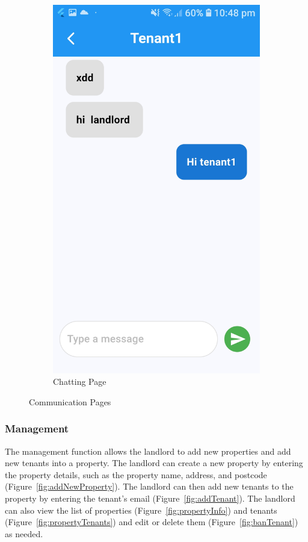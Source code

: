 \documentclass[sigconf]{acmart}
\begin{document}
\begin{figure}[h]
\begin{subfigure}{0.24\textwidth}
    \includegraphics[width=\textwidth]{chatting.jpg}
    \caption{Chatting Page}
    \label{fig:chatRoom}
  \end{subfigure}
  \caption{Communication Pages}
\end{figure}

\subsubsection{Management}
The management function allows the landlord to add new properties and add new tenants into a property. The landlord can create a new property by entering the property details, such as the property name, address, and postcode (Figure~\ref{fig:addNewProperty}). The landlord can then add new tenants to the property by entering the tenant's email (Figure~\ref{fig:addTenant}). The landlord can also view the list of properties (Figure~\ref{fig:propertyInfo}) and tenants (Figure~\ref{fig:propertyTenants}) and edit or delete them (Figure~\ref{fig:banTenant}) as needed.
\end{document}
